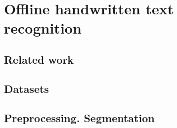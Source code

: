 \chapter{Offline handwritten text recognition}
\label{chap:ch4}



\section{Related work}
\label{subsec:ch4sec1}



\section{Datasets}
\label{subsec:ch4sec2}



\section{Preprocessing. Segmentation}
\label{subsec:ch4sec3}




